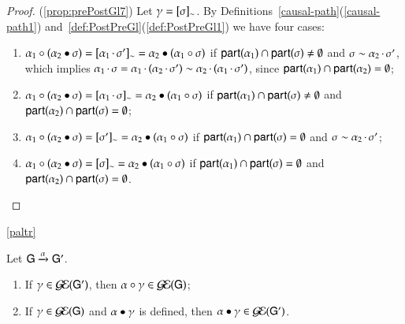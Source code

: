 \begin{proof}
   (\ref{prop:prePostGl7}) Let $\comocc=\eqclass{\comseq}$. By Definitions~\ref{causal-path}(\ref{causal-path1}) and~\ref{def:PostPreGl}(\ref{def:PostPreGl1}) we have four cases:
  \begin{enumerate}[label=(\alph*)]%
\item $\preG{(\postG{\comseq}{\alpha_2})}{\alpha_1}=\eqclass{\concat{\alpha_1}{\comseq'}}=\postG{(\preG{\comseq}{\alpha_1})}{\alpha_2}$ if $\participant{\alpha_1}\cap\participant{\comseq}\not=\emptyset$ and $\comseq\sim\concat{\alpha_2}{\comseq'}$, which implies $\concat{\alpha_1}\comseq=\concat{\alpha_1}{(\concat{\alpha_2}{\comseq'})}\sim\concat{\alpha_2}{(\concat{\alpha_1}{\comseq'})}$, since $\participant{\alpha_1}\cap\participant{\alpha_2}=\emptyset$;
\item $\preG{(\postG{\comseq}{\alpha_2})}{\alpha_1}=\eqclass{\concat{\alpha_1}{\comseq}}=\postG{(\preG{\comseq}{\alpha_1})}{\alpha_2}$ if $\participant{\alpha_1}\cap\participant{\comseq}\not=\emptyset$ and $\participant{\alpha_2}\cap\participant{\comseq}=\emptyset$;
\item $\preG{(\postG{\comseq}{\alpha_2})}{\alpha_1}=\eqclass{\comseq'}=\postG{(\preG{\comseq}{\alpha_1})}{\alpha_2}$ if $\participant{\alpha_1}\cap\participant{\comseq}=\emptyset$ and $\comseq\sim\concat{\alpha_2}{\comseq'}$;
\item $\preG{(\postG{\comseq}{\alpha_2})}{\alpha_1}=\eqclass{\comseq}=\postG{(\preG{\comseq}{\alpha_1})}{\alpha_2}$ if $\participant{\alpha_1}\cap\participant{\comseq}=\emptyset$ and $\participant{\alpha_2}\cap\participant{\comseq}=\emptyset$. \qedhere
  \end{enumerate}
  \end{proof}
\begin{lemmaa}{\ref{paltr}}{Let $\G\stackred\alpha \G'$.
\begin{enumerate}
\item If $\comocc\in\EGG(\G')$, then $\preG\comocc{\alpha}\in \EGG(\G)$;
\item If $\comocc\in\EGG(\G)$ and $\postG\comocc{\alpha}$ is defined, then $\postG\comocc{\alpha}\in\EGG( \G')$.
\end{enumerate}
}\end{lemmaa}

